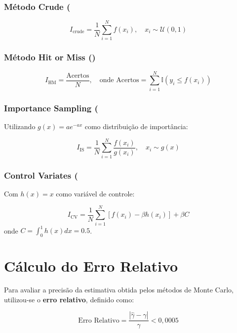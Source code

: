 \documentclass[12pt, a4paper]{article}
\begin{document}
\subsubsection{Método Crude (}
\begin{equation}
    I_{\text{crude}} = \frac{1}{N}\sum_{i=1}^N f(x_i), \quad x_i \sim \mathcal{U}(0,1)
\end{equation}

\subsubsection{Método Hit or Miss ()}
\begin{equation}
    I_{\text{HM}} = \frac{\text{Acertos}}{N}, \quad \text{onde } \text{Acertos} = \sum_{i=1}^N \mathbb{I}(y_i \leq f(x_i))
\end{equation}

\subsubsection{Importance Sampling (} 
Utilizando \( g(x) = ae^{-ax} \) como distribuição de importância:

\begin{equation}
    I_{\text{IS}} = \frac{1}{N}\sum_{i=1}^N \frac{f(x_i)}{g(x_i)}, \quad x_i \sim g(x)
\end{equation}

\subsubsection{Control Variates (}
Com \( h(x) = x \) como variável de controle:

\begin{equation}
    I_{\text{CV}} = \frac{1}{N}\sum_{i=1}^N \left[f(x_i) - \beta h(x_i)\right] + \beta C
\end{equation}
onde \( C = \int_0^1 h(x)dx = 0.5 \).

\section{Cálculo do Erro Relativo}
\label{sec:erro}

Para avaliar a precisão da estimativa obtida pelos métodos de Monte Carlo, utilizou-se o \textbf{erro relativo}, definido como:

\begin{equation}
\text{Erro Relativo} = \frac{|\hat{\gamma} - \gamma|}{\gamma} < 0,0005
\label{eq:erro_rel}
\end{equation}
\end{document}
